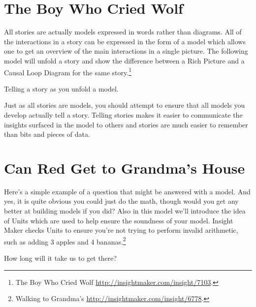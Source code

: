 \documentclass[]{memoir}
\begin{document}
\section{The Boy Who Cried Wolf}

All stories are actually models expressed in words rather than diagrams.
All of the interactions in a story can be expressed in the form of a
model which allows one to get an overview of the main interactions in a
single picture. The following model will unfold a story and show the
difference between a Rich Picture and a Causal Loop Diagram for the same
story.\footnote{The Boy Who Cried Wolf
  \url{http://insightmaker.com/insight/7103}.}

\FloatBarrier 

\begin{model}[frametitle={Model: The Boy Who Cried Wolf}] 

 Telling a story as you unfold a model.




 \end{model}

Just as all stories are models, you should attempt to ensure that all
models you develop actually tell a story. Telling stories makes it
easier to communicate the insights surfaced in the model to others and
stories are much easier to remember than bits and pieces of data.

\section{Can Red Get to Grandma's House}

Here's a simple example of a question that might be answered with a
model. And yes, it is quite obvious you could just do the math, though
would you get any better at building models if you did? Also in this
model we'll introduce the idea of Units which are used to help ensure
the soundness of your model. Insight Maker checks Units to ensure you're
not trying to perform invalid arithmetic, such as adding 3 apples and 4
bananas.\footnote{Walking to Grandma's
  \url{http://insightmaker.com/insight/6778}.}

\FloatBarrier 

\begin{model}[frametitle={Model: Walking to Grandma's}] 

 How long will it take us to get there?




 \end{model}
\end{document}
